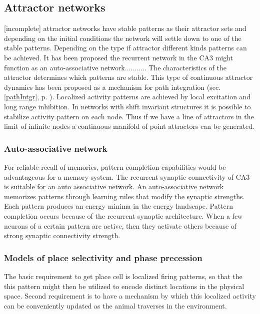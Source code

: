 \subsection{Attractor networks}
[incomplete]
attractor networks have stable patterns as their attractor sets and depending on the initial conditions the network will settle down to one of the stable patterns. Depending on the type if attractor different kinds patterns can be achieved. It has been proposed the recurrent network in the CA3 might function as an auto-associative network........... The characteristics of the attractor determines which patterns are stable.
This type of continuous attractor dynamics has been proposed as a mechanism for path integration (sec. \ref{pathIntgr}, p. \pageref{pathIntgr}). Localized activity patterns are achieved by local excitation and long range inhibition. In networks  with shift invariant structures it is possible to stabilize activity pattern on each node. Thus if we have a line of attractors in the limit of infinite nodes a continuous manifold of point attractors can be generated.
\\

\subsubsection{Auto-associative network}
For reliable recall of memories, pattern completion capabilities would be advantageous for a memory system. The recurrent synaptic connectivity of CA3 is suitable for an auto associative network.
An auto-associative network memorizes patterns through learning rules that modify the synaptic strengths. Each pattern produces an energy minima in the energy landscape. Pattern completion occurs because of the recurrent synaptic architecture. When a few neurons of a certain pattern are active, then they activate others because of strong synaptic connectivity strength. 


\subsubsection{Models of place selectivity and phase precession}
The basic requirement to get place cell is localized firing patterns, so that the this pattern might then be utilized to encode distinct locations in the physical space. Second requirement is to have a mechanism by which this localized activity can be conveniently updated as the animal traverses in the environment.\\

